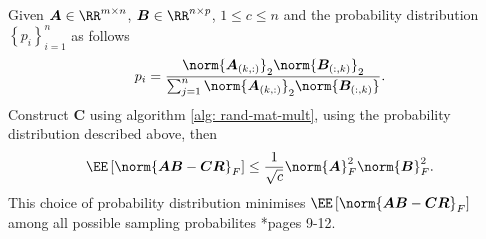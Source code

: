 \begin{lem} \label{lem: col-pro-bounds-gen}
    Given $\bm{A} \in \RR^{m \times n}$, $\bm{B} \in \RR^{n \times p}$, $1 \leq c \leq n$ and the probability distribution $\left\{ p_i \right\}_{i=1}^{n}$ as follows
    \[
        p_i = \frac{\norm{\bm{A}_{(k,:)}}_2 \norm{\bm{B}_{(:,k)}}_2}{\sum_{j=1}^{n} \norm{\bm{A}_{(k,:)}}_2 \norm{\bm{B}_{(:,k)}}}.
    \]
    Construct $\bm{C}$ using algorithm \ref{alg: rand-mat-mult}, using the probability distribution described above, then
    \[
        \EE \left[ \norm{\bm{A} \bm{B} - \bm{C} \bm{R}}_{F} \right] \leq \frac{1}{\sqrt{c}} \norm{\bm{A}}^2_{F} \norm{\bm{B}}^2_{F}.
    \]
    This choice of probability distribution minimises $\EE \left[ \norm{\bm{A} \bm{B} - \bm{C} \bm{R}}_{F} \right]$ among all possible sampling probabilites \cite{doi:10.1137/S0097539704442684}*{pages 9-12}.
\end{lem}

